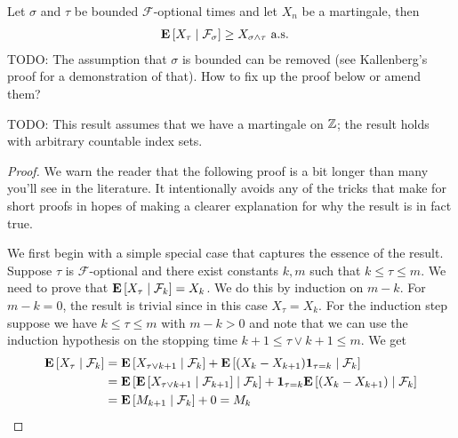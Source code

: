 \begin{thm}\label{OptionalStoppingDiscrete}Let $\sigma$ and $\tau$ be bounded
  $\mathcal{F}$-optional times and
  let $X_n$ be a martingale, then 
\begin{align*}
\cexpectationlong{\mathcal{F}_\sigma}{X_\tau} &\geq X_{\sigma \wedge
  \tau}
\text{ a.s.}
\end{align*}
TODO: The assumption that $\sigma$ is bounded can be removed (see
Kallenberg's proof for a demonstration of that).  How to fix up the
proof below or amend them?

TODO: This result assumes that we have a martingale on $\integers$;
the result holds with arbitrary countable index sets.
\end{thm}
\begin{proof}
We warn the reader that the following proof is a bit longer than many
you'll see in the literature.  It intentionally avoids any of the
tricks that make for short proofs in hopes of making a clearer
explanation for why the result is in fact true.

We first begin with a simple special case that captures the essence of
the result.  Suppose $\tau$ is $\mathcal{F}$-optional and there exist
constants $k, m$ such that $k \leq \tau \leq m$.  We need to prove
that $\cexpectationlong{\mathcal{F}_k}{X_\tau} = X_k$.  We do this by
induction on $m-k$.  For $m-k=0$, the result is trivial since in this
case $X_\tau = X_k$.  For the induction step suppose we have $k \leq
\tau \leq m$ with $m-k >0$ and note that we can use the induction
hypothesis on the stopping time $k+1 \leq \tau\vee k+1 \leq m$.  We
get
\begin{align*}
\cexpectationlong{\mathcal{F}_k}{X_\tau} &=
\cexpectationlong{\mathcal{F}_k}{X_{\tau \vee k+1}} +
\cexpectationlong{\mathcal{F}_k}{(X_k-X_{k+1})\characteristic{\tau=k}}
\\
&=\cexpectationlong{\mathcal{F}_k}{\cexpectationlong{\mathcal{F}_{k+1}}{X_{\tau
      \vee k+1}} } +
\characteristic{\tau=k}\cexpectationlong{\mathcal{F}_k}{(X_k-X_{k+1})}
\\
&=\cexpectationlong{\mathcal{F}_k}{M_{k+1}} + 0 = M_k
\end{align*}


\end{proof}
